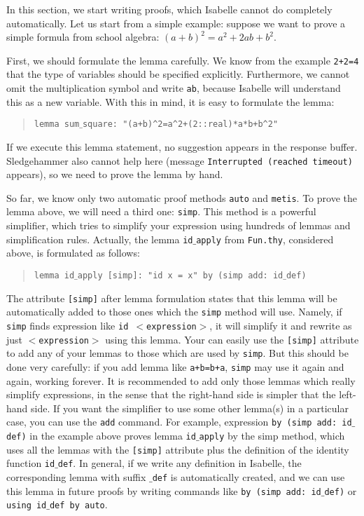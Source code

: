 \documentclass[11pt]{article}
\newcommand{\prog}[1]{\par\noindent\begin{quote}#1\end{quote}\par\noindent}
\begin{document}
In this section, we start writing proofs, which Isabelle cannot do completely automatically.  Let us start from a simple example: suppose we want to prove a simple formula from school algebra: {\tt $(a+b)^2=a^2+2ab+b^2$}.

First, we should formulate the lemma carefully. We know from the example {\tt 2+2=4} that the type of variables should be specified explicitly. Furthermore, we cannot omit the multiplication symbol {\tt *} and write {\tt ab}, because Isabelle will understand this as a new variable. With this in mind, it is easy to formulate the lemma:

\prog{\tt lemma sum$\_$square: "(a+b)\^{}2=a\^{}2+(2::real)*a*b+b\^{}2"}%

If we execute this lemma statement, no suggestion appears in the response buffer. Sledgehammer also cannot help here (message {\tt Interrupted (reached timeout)} appears), so we need to prove the lemma by hand.

So far, we know only two automatic proof methods {\tt auto} and {\tt metis}. To prove the lemma above, we will need a third one: {\tt simp}. This method is a powerful simplifier, which tries to simplify your expression using hundreds of lemmas and simplification rules. Actually, the lemma {\tt id$\_$apply} from {\tt Fun.thy}, considered above, is formulated as follows:

\prog{\tt lemma id$\_$apply [simp]: "id x = x" by (simp add:~id$\_$def)}%

The attribute {\tt [simp]} after lemma formulation states that this lemma will be automatically added to those ones which the {\tt simp} method will use. Namely, if {\tt simp} finds expression like {\tt id $<$expression$>$}, it will simplify it and rewrite as just {\tt $<$expression$>$} using this lemma. Your can easily use the {\tt [simp]} attribute to add any of your lemmas to those which are used by {\tt simp}. But this should be done very carefully: if you add lemma like {\tt a+b=b+a}, {\tt simp} may use it again and again, working forever. It is recommended to add only those lemmas which really simplify expressions, in the sense that the right-hand side is simpler that the left-hand side. If you want the simplifier to use some other lemma(s) in a particular case, you can use the {\tt add} command. For example, expression {\tt by (simp add:~id$\_$def)} in the example above proves lemma {\tt id$\_$apply} by the simp method, which uses all the lemmas with the {\tt [simp]} attribute plus the definition of the identity function {\tt id$\_$def}. In general, if we write any definition in Isabelle, the corresponding lemma with suffix {\tt $\_$def} is automatically created, and we can use this lemma in future proofs by writing commands like {\tt by (simp add:~id$\_$def)} or {\tt using id$\_$def by auto}.
\end{document}

